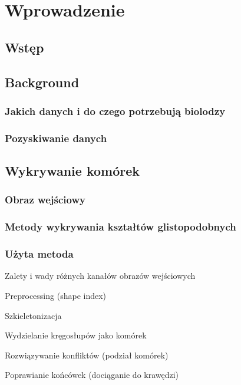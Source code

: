 \documentclass[declaration,shortabstract]{iithesis}
\author         {Artur Rosa}
\begin{document}

\chapter{Wprowadzenie}
\section{Wstęp}



\section{Background}


\subsection{Jakich danych i do czego potrzebują biolodzy}

\subsection{Pozyskiwanie danych}





\section{Wykrywanie komórek}


\subsection{Obraz wejściowy}
\subsection{Metody wykrywania kształtów glistopodobnych}
\subsection{Użyta metoda}

Zalety i wady różnych kanałów obrazów wejściowych

Preprocessing (shape index)

Szkieletonizacja

Wydzielanie kręgosłupów jako komórek

Rozwiązywanie konfliktów (podział komórek)

Poprawianie końcówek (dociąganie do krawędzi)
\end{document}
